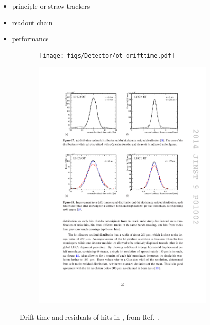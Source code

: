 {\color{Red}
\begin{itemize}
\item principle or straw trackers
\item readout chain
\item performance
\end{itemize}
}




\begin{figure}[!h]
    \centering
    \begin{subfigure}[t]{0.4\textwidth}
        \centering
        \texttt{[image: figs/Detector/ot\_drifttime.pdf]}
    \end{subfigure}
    \begin{subfigure}[t]{0.4\textwidth}
        \centering
        \includegraphics[width=1.0\textwidth]{figs/Detector/ot_residuals.pdf}
    \end{subfigure}
    \caption{Drift time and residuals of hits in \ot, from Ref.~\cite{LHCb-DP-2013-003}.}
    \label{fig:Dec_magnet}   
\end{figure}

